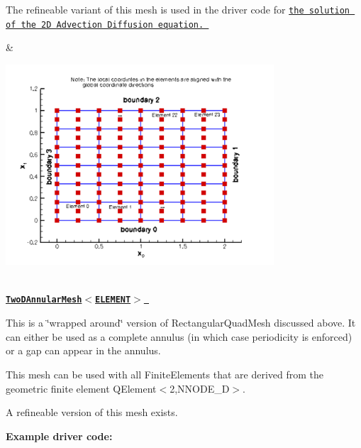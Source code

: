 \begin{center}
\begin{longtabu}
\begin{DoxyItemize}
\item The refineable variant of this mesh is used in the driver code for \href{../../../advection_diffusion/two_d_adv_diff_adapt/html/index.html}{\tt the solution of the 2D Advection Diffusion equation. }
\end{DoxyItemize}& 
\begin{DoxyImageNoCaption}
  \mbox{\includegraphics[width=0.75\textwidth]{simple_rectangular_quadmesh}}
\end{DoxyImageNoCaption}
   \\
\href{classoomph_1_1TwoDAnnularMesh.html}{\tt {\bfseries  Two\+D\+Annular\+Mesh$<$\+E\+L\+E\+M\+E\+N\+T$>$ }} ~\newline
~\newline

\begin{DoxyItemize}
\item This is a \char`\"{}wrapped around\char`\"{} version of {\ttfamily Rectangular\+Quad\+Mesh} discussed above. It can either be used as a complete annulus (in which case periodicity is enforced) or a gap can appear in the annulus.
\item This mesh can be used with all {\ttfamily Finite\+Elements} that are derived from the geometric finite element {\ttfamily Q\+Element$<$2,\+N\+N\+O\+D\+E\+\_\+D$>$}.
\item A refineable version of this mesh exists.
\end{DoxyItemize}{\bfseries Example driver code\+:} ~\newline


\end{longtabu}
\end{center}
